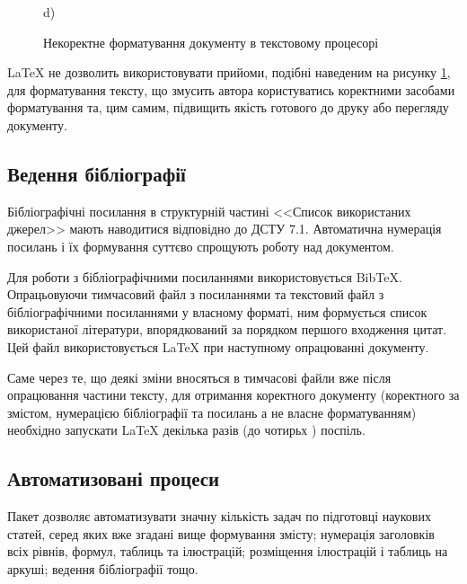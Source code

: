 \begin{figure}[h]
\begin{minipage}[h]{0.47\linewidth}
	\end{minipage}
	\hfill
	\begin{minipage}[h]{0.47\linewidth}
		 d) \\
	\end{minipage}
	\caption{Некоректне форматування документу в текстовому процесорі}
	\label{ris:wrongFormat}
\end{figure}

\LaTeX{} не дозволить використовувати прийоми, подібні наведеним на рисунку \ref{ris:wrongFormat}, для форматування тексту, що змусить автора користуватись коректними засобами форматування та, цим самим, підвищить якість готового до друку або перегляду документу.

\subsection{Ведення бібліографії}

Бібліографічні посилання в структурній частині <<Список використаних джерел>> мають наводитися відповідно до ДСТУ 7.1. Автоматична нумерація посилань і їх формування суттєво спрощують роботу над документом. 

Для роботи з бібліографічними посиланнями використовується BibTeX. Опрацьовуючи тимчасовий файл з посиланнями та текстовий файл з бібліографічними посиланнями у власному форматі, ним формується список використаної літератури, впорядкований за порядком першого входження цитат. Цей файл використовується \LaTeX{} при наступному опрацюванні документу.

Саме через те, що деякі зміни вносяться в тимчасові файли вже після опрацювання частини тексту, для отримання коректного документу (коректного за змістом, нумерацією бібліографії та посилань а не власне форматуванням) необхідно запускати \LaTeX{} декілька разів  (до чотирьх \cite{Stolyarov2010SverstaiDiplom}) поспіль.

\subsection{Автоматизовані процеси}

Пакет дозволяє автоматизувати значну кількість задач по підготовці наукових статей, серед яких вже згадані вище формування змісту; нумерація заголовків всіх рівнів, формул, таблиць та ілюстрацій; розміщення ілюстрацій і таблиць на аркуші; ведення бібліографії тощо.
